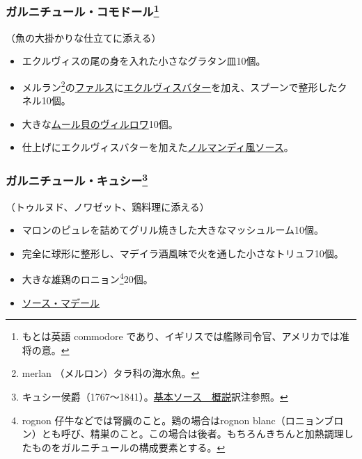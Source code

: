 \begin{recette}
\hypertarget{garniture-a-la-commodore}{%
\subsubsection[ガルニチュール・コモドール]{\texorpdfstring{ガルニチュール・コモドール\footnote{もとは英語
  commodore であり、イギリスでは艦隊司令官、アメリカでは准将の意。}}{ガルニチュール・コモドール}}\label{garniture-a-la-commodore}}



（魚の大掛かりな仕立てに添える）

\begin{itemize}
\item
  エクルヴィスの尾の身を入れた小さなグラタン皿10個。
\item
  メルラン\footnote{merlan （メルロン）タラ科の海水魚。}の\protect\hyperlink{farce-a}{ファルス}に\protect\hyperlink{beurre-d-ecrevissse}{エクルヴィスバター}を加え、スプーンで整形したクネル10個。
\item
  大きな\protect\hyperlink{moules-a-la-villeroy}{ムール貝のヴィルロワ}10個。
\item
  仕上げにエクルヴィスバターを加えた\protect\hyperlink{sauce-normande}{ノルマンディ風ソース}。
\end{itemize}

\hypertarget{garniture-a-la-commodore}{%
\subsubsection[ガルニチュール・キュシー]{\texorpdfstring{ガルニチュール・キュシー\footnote{キュシー侯爵（1767〜1841）。\protect\hyperlink{osbservation-sur-la-sauce}{基本ソース　概説}訳注参照。}}{ガルニチュール・キュシー}}\label{garniture-a-la-commodore}}



（トゥルヌド、ノワゼット、鶏料理に添える）

\begin{itemize}
\item
  マロンのピュレを詰めてグリル焼きした大きなマッシュルーム10個。
\item
  完全に球形に整形し、マデイラ酒風味で火を通した小さなトリュフ10個。
\item
  大きな雄鶏のロニョン\footnote{rognon
    仔牛などでは腎臓のこと。鶏の場合はrognon
    blanc（ロニョンブロン）とも呼び、精巣のこと。この場合は後者。もちろんきちんと加熱調理したものをガルニチュールの構成要素とする。}20個。
\item
  \protect\hyperlink{sauce-madere}{ソース・マデール}
\end{itemize}


\end{recette}
